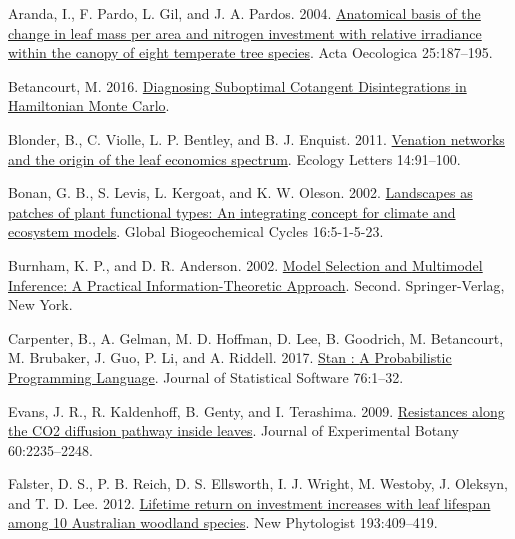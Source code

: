 \documentclass[
  12pt,
  a4paper,
,tablecaptionabove
]{scrartcl}
\newlength{\cslhangindent}
\newenvironment{CSLReferences}[2] %
 {%
  \setlength{\parindent}{0pt}
  \ifodd #1 \everypar{\setlength{\hangindent}{\cslhangindent}}\ignorespaces\fi
  \ifnum #2 > 0
  \setlength{\parskip}{#2\baselineskip}
  \fi
 }%
 {}
\begin{document}
\hypertarget{refs}{}
\begin{CSLReferences}{1}{0}
\leavevmode{}%
Aranda, I., F. Pardo, L. Gil, and J. A. Pardos. 2004. \href{https://doi.org/10.1016/j.actao.2004.01.003}{Anatomical basis of the change in leaf mass per area and nitrogen investment with relative irradiance within the canopy of eight temperate tree species}. Acta Oecologica 25:187--195.

\leavevmode{}%
Betancourt, M. 2016. \href{https://arxiv.org/abs/1604.00695}{Diagnosing {Suboptimal Cotangent Disintegrations} in {Hamiltonian Monte Carlo}}.

\leavevmode{}%
Blonder, B., C. Violle, L. P. Bentley, and B. J. Enquist. 2011. \href{https://doi.org/10.1111/j.1461-0248.2010.01554.x}{Venation networks and the origin of the leaf economics spectrum}. Ecology Letters 14:91--100.

\leavevmode{}%
Bonan, G. B., S. Levis, L. Kergoat, and K. W. Oleson. 2002. \href{https://doi.org/10.1029/2000GB001360}{Landscapes as patches of plant functional types: {An} integrating concept for climate and ecosystem models}. Global Biogeochemical Cycles 16:5-1-5-23.

\leavevmode{}%
Burnham, K. P., and D. R. Anderson. 2002. \href{https://doi.org/10.1007/b97636}{Model {Selection} and {Multimodel Inference}: {A Practical Information-Theoretic Approach}}. Second. {Springer-Verlag}, {New York}.

\leavevmode{}%
Carpenter, B., A. Gelman, M. D. Hoffman, D. Lee, B. Goodrich, M. Betancourt, M. Brubaker, J. Guo, P. Li, and A. Riddell. 2017. \href{https://doi.org/10.18637/jss.v076.i01}{Stan : {A Probabilistic Programming Language}}. Journal of Statistical Software 76:1--32.

\leavevmode{}%
Evans, J. R., R. Kaldenhoff, B. Genty, and I. Terashima. 2009. \href{https://doi.org/10.1093/jxb/erp117}{Resistances along the {CO2} diffusion pathway inside leaves}. Journal of Experimental Botany 60:2235--2248.

\leavevmode{}%
Falster, D. S., P. B. Reich, D. S. Ellsworth, I. J. Wright, M. Westoby, J. Oleksyn, and T. D. Lee. 2012. \href{https://doi.org/10.1111/j.1469-8137.2011.03940.x}{Lifetime return on investment increases with leaf lifespan among 10 {Australian} woodland species}. New Phytologist 193:409--419.


\end{CSLReferences}
\end{document}
